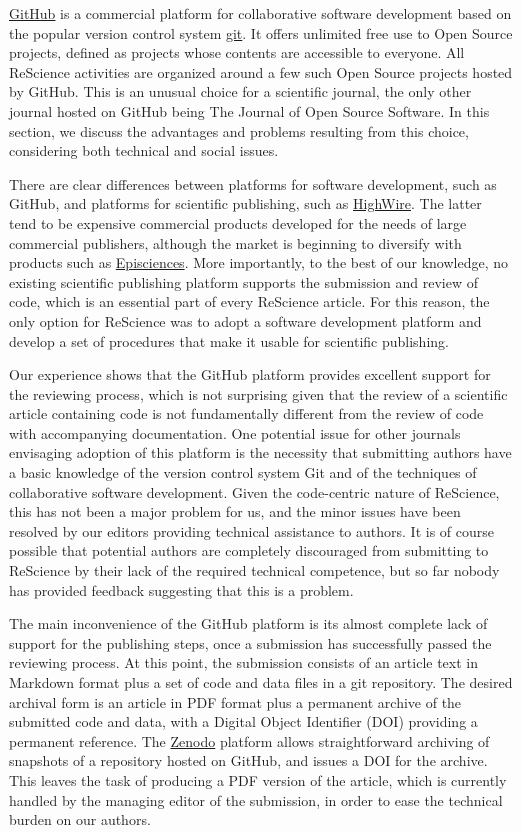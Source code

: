 \documentclass[a4paper,10pt, twocolumn]{article}
\begin{document}
\href{http://github.com/}{GitHub} is a commercial platform for collaborative
software development based on the popular version control system
\href{https://git-scm.com/}{git}. It offers unlimited free use to Open Source
projects, defined as projects whose contents are accessible to everyone. All
ReScience activities are organized around a few such Open Source projects
hosted by GitHub. This is an unusual choice for a scientific journal, the only
other journal hosted on GitHub being The Journal of Open Source
Software\citep{Smith:2017}. In this section, we discuss the advantages and
problems resulting from this choice, considering both technical and social
issues.

There are clear differences between platforms for software
development, such as GitHub, and platforms for scientific publishing,
such as \href{http://home.highwire.org/}{HighWire}. The latter tend to
be expensive commercial products developed for the needs of large
commercial publishers, although the market is beginning to diversify
with products such as
\href{https://www.episciences.org/}{Episciences}.  More importantly,
to the best of our knowledge, no existing scientific publishing
platform supports the submission and review of code, which is an
essential part of every ReScience article. For this reason, the only
option for ReScience was to adopt a software development platform and
develop a set of procedures that make it usable for scientific
publishing.

Our experience shows that the GitHub platform provides excellent
support for the reviewing process, which is not surprising given that the
review of a scientific article containing code is not fundamentally
different from the review of code with accompanying documentation.
One potential issue for other journals envisaging adoption of this
platform is the necessity that submitting authors have a basic
knowledge of the version control system Git and of the techniques of
collaborative software development. Given the code-centric nature of
ReScience, this has not been a major problem for us, and the minor
issues have been resolved by our editors providing technical assistance
to authors. It is of course possible that potential authors are
completely discouraged from submitting to ReScience by their lack
of the required technical competence, but so far nobody has
provided feedback suggesting that this is a problem.

The main inconvenience of the GitHub platform is its almost complete
lack of support for the publishing steps, once a submission has
successfully passed the reviewing process. At this point, the
submission consists of an article text in Markdown format plus a set
of code and data files in a git repository. The desired archival form
is an article in PDF format plus a permanent archive of the submitted
code and data, with a Digital Object Identifier (DOI) providing a
permanent reference. The \href{https://zenodo.org/}{Zenodo} platform
allows straightforward archiving of snapshots of a repository hosted
on GitHub, and issues a DOI for the archive. This leaves the task
of producing a PDF version of the article, which is currently handled
by the managing editor of the submission, in order to ease the technical
burden on our authors.
\end{document}
